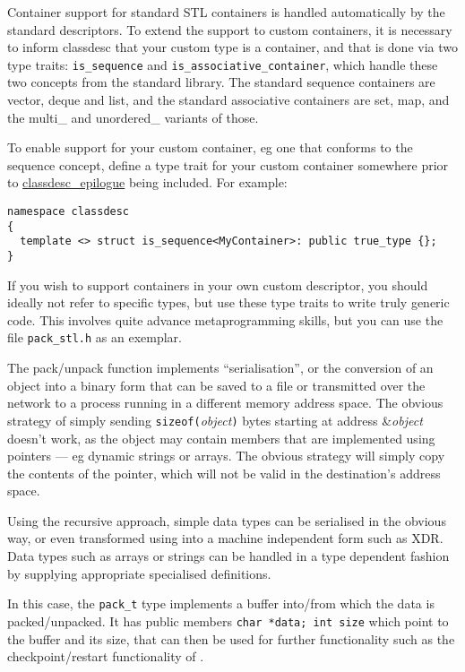 Container support for standard STL containers is handled automatically
by the standard descriptors. To extend the support to custom
containers, it is necessary to inform classdesc that your custom type
is a container, and that is done via two type traits:
\verb+is_sequence+\label{is_sequence} and
\verb+is_associative_container+\label{is_associative_container},
which handle these two concepts from the standard library. The
standard sequence containers are vector, deque and list, and the
standard associative containers are set, map, and the multi\_ and
unordered\_ variants of those.

To enable support for your custom container, eg one that conforms to
the sequence concept, define a type trait for your custom container
somewhere prior to \hyperref{\verb+classdesc\_epilogue.h+}{(See
  \S}{)}{classdesc_epilogue} being included. For example:
\begin{verbatim}
namespace classdesc
{
  template <> struct is_sequence<MyContainer>: public true_type {};
}
\end{verbatim}

If you wish to support containers in your own custom descriptor, you
should ideally not refer to specific types, but use these type traits
to write truly generic code. This involves quite advance
metaprogramming skills, but you can use the file \verb+pack_stl.h+ as
an exemplar.


The pack/unpack function implements
``serialisation'', or the conversion of an object
into a binary form that can be saved to a file or transmitted over the
network to a process running in a different memory address space. The
obvious strategy of simply sending {\tt sizeof(}{\em object}{\tt )}
bytes starting at address \&{\em object} doesn't work, as the object
may contain members that are implemented using pointers --- eg dynamic
strings or arrays. The obvious strategy will simply copy the contents
of the pointer, which will not be valid in the destination's address
space.

Using the recursive approach, simple data types can be serialised in
the obvious way, or even transformed using into a machine independent
form such as XDR. Data types such as arrays or strings can
be handled in a type dependent fashion by supplying appropriate specialised
definitions.

In this case, the {\tt pack\_t} type implements a buffer into/from
which the data is packed/unpacked. It has public members {\tt char
*data; int size} which point to the buffer and its size, that can then
be used for further functionality such as the
checkpoint/restart functionality of
\EcoLab{}.

